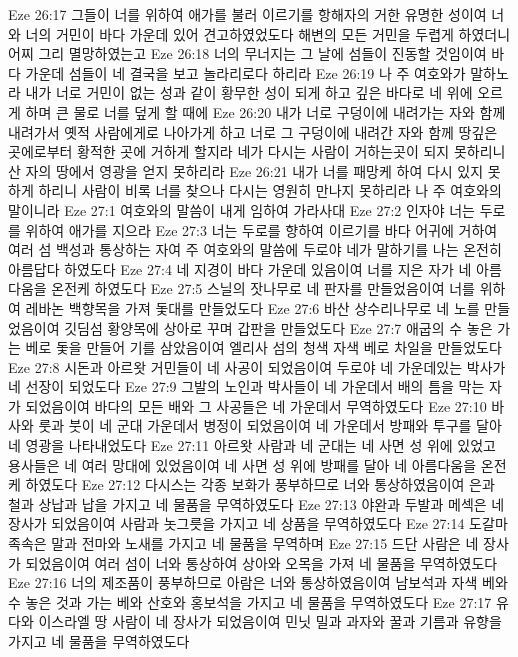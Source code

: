 Eze 26:17  그들이 너를 위하여 애가를 불러 이르기를 항해자의 거한 유명한 성이여 너와 너의 거민이 바다 가운데 있어 견고하였었도다 해변의 모든 거민을 두렵게 하였더니 어찌 그리 멸망하였는고
Eze 26:18  너의 무너지는 그 날에 섬들이 진동할 것임이여 바다 가운데 섬들이 네 결국을 보고 놀라리로다 하리라
Eze 26:19  나 주 여호와가 말하노라 내가 너로 거민이 없는 성과 같이 황무한 성이 되게 하고 깊은 바다로 네 위에 오르게 하며 큰 물로 너를 덮게 할 때에
Eze 26:20  내가 너로 구덩이에 내려가는 자와 함께 내려가서 옛적 사람에게로 나아가게 하고 너로 그 구덩이에 내려간 자와 함께 땅깊은 곳에로부터 황적한 곳에 거하게 할지라 네가 다시는 사람이 거하는곳이 되지 못하리니 산 자의 땅에서 영광을 얻지 못하리라
Eze 26:21  내가 너를 패망케 하여 다시 있지 못하게 하리니 사람이 비록 너를 찾으나 다시는 영원히 만나지 못하리라 나 주 여호와의 말이니라
Eze 27:1  여호와의 말씀이 내게 임하여 가라사대
Eze 27:2  인자야 너는 두로를 위하여 애가를 지으라
Eze 27:3  너는 두로를 향하여 이르기를 바다 어귀에 거하여 여러 섬 백성과 통상하는 자여 주 여호와의 말씀에 두로야 네가 말하기를 나는 온전히 아름답다 하였도다
Eze 27:4  네 지경이 바다 가운데 있음이여 너를 지은 자가 네 아름다움을 온전케 하였도다
Eze 27:5  스닐의 잣나무로 네 판자를 만들었음이여 너를 위하여 레바논 백향목을 가져 돛대를 만들었도다
Eze 27:6  바산 상수리나무로 네 노를 만들었음이여 깃딤섬 황양목에 상아로 꾸며 갑판을 만들었도다
Eze 27:7  애굽의 수 놓은 가는 베로 돛을 만들어 기를 삼았음이여 엘리사 섬의 청색 자색 베로 차일을 만들었도다
Eze 27:8  시돈과 아르왓 거민들이 네 사공이 되었음이여 두로야 네 가운데있는 박사가 네 선장이 되었도다
Eze 27:9  그발의 노인과 박사들이 네 가운데서 배의 틈을 막는 자가 되었음이여 바다의 모든 배와 그 사공들은 네 가운데서 무역하였도다
Eze 27:10  바사와 룻과 붓이 네 군대 가운데서 병정이 되었음이여 네 가운데서 방패와 투구를 달아 네 영광을 나타내었도다
Eze 27:11  아르왓 사람과 네 군대는 네 사면 성 위에 있었고 용사들은 네 여러 망대에 있었음이여 네 사면 성 위에 방패를 달아 네 아름다움을 온전케 하였도다
Eze 27:12  다시스는 각종 보화가 풍부하므로 너와 통상하였음이여 은과 철과 상납과 납을 가지고 네 물품을 무역하였도다
Eze 27:13  야완과 두발과 메섹은 네 장사가 되었음이여 사람과 놋그릇을 가지고 네 상품을 무역하였도다
Eze 27:14  도갈마 족속은 말과 전마와 노새를 가지고 네 물품을 무역하며
Eze 27:15  드단 사람은 네 장사가 되었음이여 여러 섬이 너와 통상하여 상아와 오목을 가져 네 물품을 무역하였도다
Eze 27:16  너의 제조품이 풍부하므로 아람은 너와 통상하였음이여 남보석과 자색 베와 수 놓은 것과 가는 베와 산호와 홍보석을 가지고 네 물품을 무역하였도다
Eze 27:17  유다와 이스라엘 땅 사람이 네 장사가 되었음이여 민닛 밀과 과자와 꿀과 기름과 유향을 가지고 네 물품을 무역하였도다
